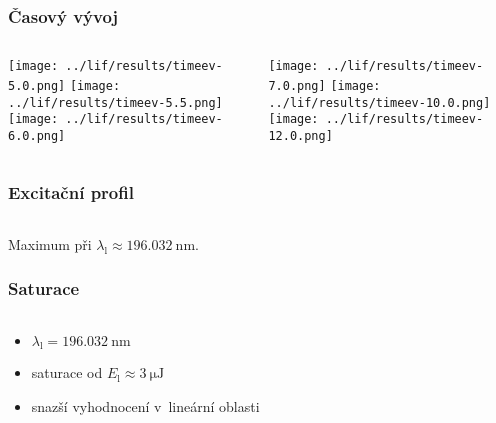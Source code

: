 \documentclass{beamer}
\newcommand\en{E}
\newcommand\enlaser{\en_\text{l}}
\newcommand\wavelen{\lambda}
\newcommand\wavelenlaser{\wavelen_\text{l}}
\begin{document}
\begin{frame}
	\frametitle{Časový vývoj}
	\begin{columns}[c]
		\begin{column}{0.48\textwidth}
			\centering
			\texttt{[image: ../lif/results/timeev-5.0.png]}
			\texttt{[image: ../lif/results/timeev-5.5.png]}
			\texttt{[image: ../lif/results/timeev-6.0.png]}
		\end{column}
		\begin{column}{0.48\textwidth}
			\centering
			\texttt{[image: ../lif/results/timeev-7.0.png]}
			\texttt{[image: ../lif/results/timeev-10.0.png]}
			\texttt{[image: ../lif/results/timeev-12.0.png]}
		\end{column}
	\end{columns}
\end{frame}

\begin{frame}
	\frametitle{Excitační profil}
	\begin{columns}[c]
		\begin{column}{0.48\textwidth}
		\end{column}
		\begin{column}{0.48\textwidth}
		\end{column}
	\end{columns}
	\bigskip
	Maximum při $\wavelenlaser \approx \SI{196.032}{\nano\metre}$.
\end{frame}

\begin{frame}
	\frametitle{Saturace}
	\begin{columns}[c]
		\begin{column}{0.38\textwidth}
			\begin{itemize}
				\item $\wavelenlaser = \SI{196.032}{\nano\metre}$
				\item saturace od $\enlaser \approx \SI{3}{\micro\joule}$
				\item snazší vyhodnocení v~lineární oblasti
			\end{itemize}
		\end{column}
		\begin{column}{0.58\textwidth}
		\end{column}
	\end{columns}
\end{frame}
\end{document}
